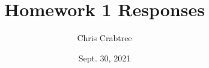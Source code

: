 \documentclass[12pt]{article}
\begin{document}
\title{Homework 1 Responses}
\author{Chris Crabtree}
\date{Sept. 30, 2021}

{
\let\clearpage\relax
\maketitle
}

      













\end{document}
